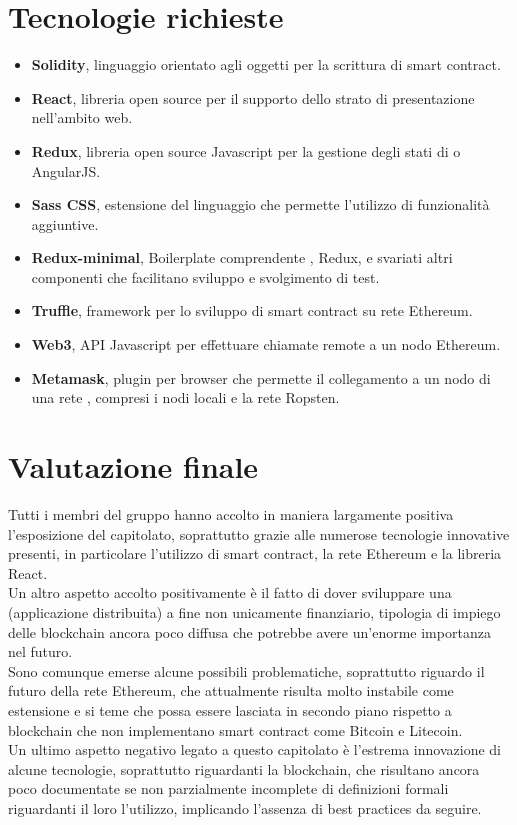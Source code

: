\documentclass[StudioDiFattibilità.tex]{subfiles}
\begin{document}
\section{Tecnologie richieste}
\begin{itemize}
	\item \textbf{Solidity}, linguaggio orientato agli oggetti per la scrittura di smart contract.
	\item \textbf{React}, libreria open source  per il supporto dello strato di presentazione nell'ambito web.
	\item \textbf{Redux}, libreria open source Javascript per la gestione degli stati di  o AngularJS.
	\item \textbf{Sass CSS}, estensione del linguaggio  che permette l'utilizzo di funzionalità aggiuntive.
	\item \textbf{Redux-minimal}, Boilerplate comprendente , Redux,  e svariati altri componenti che facilitano sviluppo e svolgimento di test.
	\item \textbf{Truffle}, framework per lo sviluppo di smart contract su rete Ethereum.
	\item \textbf{Web3}, API Javascript per effettuare chiamate remote a un nodo Ethereum.
	\item \textbf{Metamask}, plugin per browser che permette il collegamento a un nodo di una rete , compresi i nodi locali e la rete Ropsten.
\end{itemize}
\section{Valutazione finale}
Tutti i membri del gruppo hanno accolto in maniera largamente positiva l'esposizione del capitolato, soprattutto grazie alle numerose tecnologie innovative presenti, in particolare l'utilizzo di smart contract, la rete Ethereum e la libreria React.\\
Un altro aspetto accolto positivamente è il fatto di dover sviluppare una  (applicazione distribuita) a fine non unicamente finanziario, tipologia di impiego delle blockchain ancora poco diffusa che potrebbe avere un'enorme importanza nel futuro.\\
Sono comunque emerse alcune possibili problematiche, soprattutto riguardo il futuro della rete Ethereum, che attualmente risulta molto instabile come estensione e si teme che possa essere lasciata in secondo piano rispetto a blockchain che non implementano smart contract come Bitcoin e Litecoin.\\
Un ultimo aspetto negativo legato a questo capitolato è l'estrema innovazione di alcune tecnologie, soprattutto riguardanti la blockchain, che risultano ancora poco documentate se non parzialmente incomplete di definizioni formali riguardanti il loro l'utilizzo, implicando l'assenza di best practices da seguire.
\end{document}
